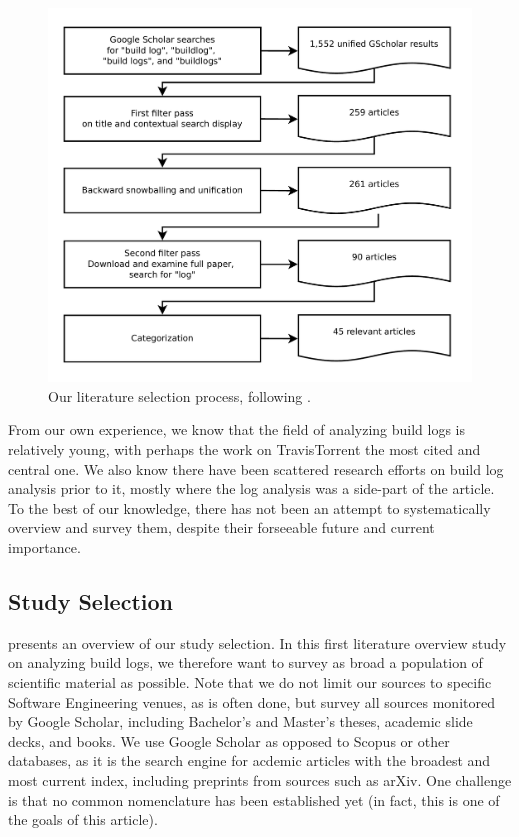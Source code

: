 \begin{figure}[htb]
        \centering
	\includegraphics[width=\columnwidth, clip]{img/lit_survey.pdf}
	\caption{Our literature selection process, following \cite{petersen2015guidelines}.}
	\label{fig:lit-survey}
\end{figure}

From our own experience, we know that the field of analyzing build
logs is relatively young, with perhaps the work on TravisTorrent the
most cited and central one. We also know there have been scattered
research efforts on build log analysis prior to it, mostly where the
log analysis was a side-part of the article. To the best of our
knowledge, there has not been an attempt to systematically overview
and survey them, despite their forseeable future and current importance.


\subsection{Study Selection}

 presents an overview of our study selection.
In this first literature overview study on analyzing build logs, we
therefore want to survey as broad a population of scientific material
as possible. Note that we do not limit our sources to specific
Software Engineering venues, as is often done, but survey all sources
monitored by Google Scholar, including Bachelor's and Master's theses,
academic slide decks, and books. We use Google Scholar as opposed to
Scopus or other databases, as it is the search engine for acdemic
articles with the broadest and most current index, including preprints
from sources such as arXiv. One challenge is that no common
nomenclature has been established yet (in fact, this is one of the
goals of this article).

